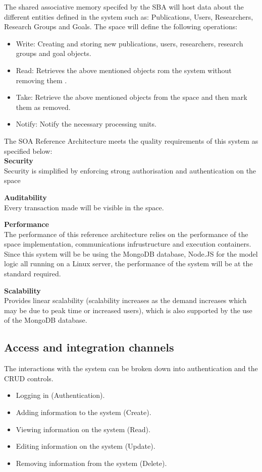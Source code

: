 \documentclass{article}
\begin{document}
The shared associative memory specifed by the SBA will host data about the different entities defined in the system such as: Publications, Users, Researchers, Research Groups and Goals. The space will define the following operations:\\

\begin{itemize}
	\item Write: Creating and storing new publications, users, researchers, research groups and goal objects.
	\item Read: Retrieves the above mentioned objects rom the system without removing them .
	\item Take: Retrieve the above mentioned objects from the space and then mark them as removed.
	\item Notify: Notify the necessary processing units. 
\end{itemize}

The SOA Reference Architecture meets the quality requirements of this system as specified below:\\

\textbf{Security}\\
Security is simplified by enforcing strong authorisation and authentication on the space

\textbf{Auditability}\\
Every transaction made will be visible in the space.

\textbf{Performance}\\
The performance of this reference architecture relies on the performance of the space implementation, communications infrustructure and execution containers. Since this system will be be using the MongoDB database, Node.JS for the model logic all running on a Linux server, the performance of the system will be at the standard required.

\textbf{Scalability}\\
Provides linear scalability (scalability increases as the demand increases which may be due to peak time or increased users), which is also supported by the use of the MongoDB database.

\subsection{Access and integration channels}

The interactions with the system can be broken down into authentication and the CRUD controls.\\
\begin{itemize}
	\item Logging in (Authentication).
	\item Adding information to the system (Create).
	\item Viewing information on the system (Read).
	\item Editing information on the system (Update).
	\item Removing information from the system (Delete).
\end{itemize}
\end{document}
